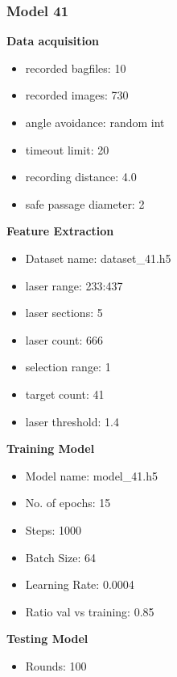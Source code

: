 \subsubsection{Model 41\label{model_41} }
\begin{multicols}{2}\textbf{Data acquisition}
\begin{itemize}
\setlength\itemsep{0.1em}
\item recorded bagfiles: 10
\item recorded images: 730
\item angle avoidance: random int
\item timeout limit: 20
\item recording distance: 4.0
\item safe passage diameter: 2
\end{itemize}
\textbf{Feature Extraction}
\begin{itemize}
\setlength\itemsep{0.1em}
\item Dataset name: dataset\_41.h5
\item  laser range: 233:437
\item  laser sections: 5
\item  laser count: 666
\item  selection range: 1
\item  target count: 41
\item  laser threshold: 1.4
\end{itemize}
\columnbreak\textbf{Training Model}
\begin{itemize}
\setlength\itemsep{0.1em}
\item  Model name: model\_41.h5
\item  No. of epochs: 15
\item  Steps: 1000
\item  Batch Size: 64
\item  Learning Rate: 0.0004
\item  Ratio val vs training: 0.85
\end{itemize}
\textbf{Testing Model}
\begin{itemize}
\setlength\itemsep{0.1em}
\item Rounds: 100
\newline
\newline
\newline
\newline
\newline
\newline
\newline
\newline

\end{itemize}
\end{multicols}
